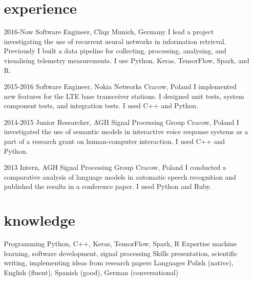 \documentclass[]{friggeri-cv_osx}
\begin{document}
\section{experience}
\begin{entrylist}
\entry
{2016-Now}
{Software Engineer, Cliqz}
{Munich, Germany}
{I lead a project investigating the use of recurrent neural networks in information retrieval. Previously I built a data pipeline for collecting, processing, analysing, and visualising telemetry measurements. I use Python, Keras, TensorFlow, Spark, and R.\\}

\entry
{2015-2016}
{Software Engineer, Nokia Networks}
{Cracow, Poland}
{I implemented new features for the LTE base transceiver stations. I designed unit tests, system component tests, and integration tests. I used C++ and Python.\\}

\entry
{2014-2015}
{Junior Researcher, AGH Signal Processing Group}
{Cracow, Poland}
{I investigated the use of semantic models in interactive voice response systems as a part of a research grant on human-computer interaction. I used C++ and Python.\\}

\entry
{2013}
{Intern, AGH Signal Processing Group}
{Cracow, Poland}
{I conducted a comparative analysis of language models in automatic speech recognition and published the results in a conference paper. I used Python and Ruby.\\}
\end{entrylist}


\section{knowledge}
\begin{entrylist}
\entry
{}
{Programming}
{}
{Python, C++, Keras, TensorFlow, Spark, R}
\entry
{}
{Expertise}
{}
{machine learning, software development, signal processing}
\entry
{}
{Skills}
{}
{presentation, scientific writing, implementing ideas from research papers}
\entry
{}
{Languages}
{}
{Polish (native), English (fluent), Spanish (good), German (conversational)}
\end{entrylist}
\end{document}
